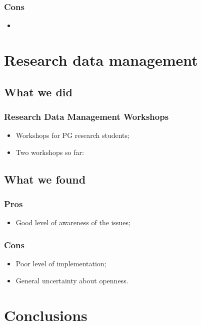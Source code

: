 \documentclass{beamer}
\begin{document}
\begin{frame}
  \frametitle{Cons}
  
  \begin{itemize}
    \item 
  \end{itemize}
\end{frame}

\section{Research data management}

\subsection{What we did}

\begin{frame}
  \frametitle{Research Data Management Workshops}
 
  \begin{itemize}
    \item Workshops for PG research students;
    \item Two workshops so far:
      \begin{itemize}
        
      \end{itemize}
  \end{itemize}
\end{frame}

\subsection{What we found}

\begin{frame}
  \frametitle{Pros}
  
  \begin{itemize}
    \item Good level of awareness of the issues;
  \end{itemize}
\end{frame}

\begin{frame}
  \frametitle{Cons}
  
  \begin{itemize}
    \item Poor level of implementation;
    \item General uncertainty about openness.
  \end{itemize}
\end{frame}

\section{Conclusions}

\begin{frame}
\end{frame}
\end{document}
